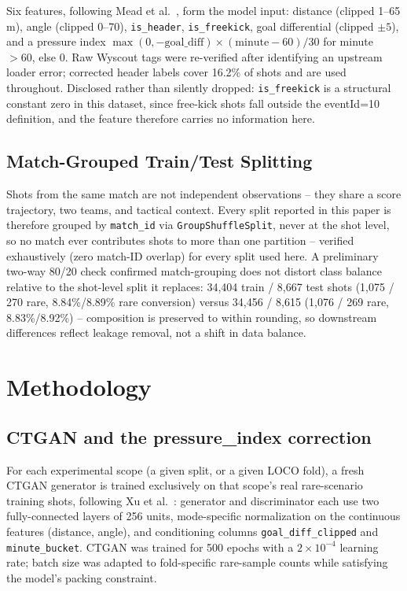 \documentclass[conference,a4paper]{IEEEtran}
\begin{document}
Six features, following Mead et al.~\cite{mead2023expected}, form the model input: distance (clipped 1--65\,m), angle (clipped 0--70\textdegree), \texttt{is\_header}, \texttt{is\_freekick}, goal differential (clipped $\pm5$), and a pressure index $\max(0,-\text{goal\_diff})\times(\text{minute}-60)/30$ for minute $>60$, else 0. Raw Wyscout tags were re-verified after identifying an upstream loader error; corrected header labels cover 16.2\% of shots and are used throughout. Disclosed rather than silently dropped: \texttt{is\_freekick} is a structural constant zero in this dataset, since free-kick shots fall outside the eventId=10 definition, and the feature therefore carries no information here.

\subsection{Match-Grouped Train/Test Splitting}
\label{sec:matchgroup}
Shots from the same match are not independent observations -- they share a score trajectory, two teams, and tactical context. Every split reported in this paper is therefore grouped by \texttt{match\_id} via \texttt{GroupShuffleSplit}, never at the shot level, so no match ever contributes shots to more than one partition -- verified exhaustively (zero match-ID overlap) for every split used here. A preliminary two-way 80/20 check confirmed match-grouping does not distort class balance relative to the shot-level split it replaces: 34,404 train / 8,667 test shots (1,075 / 270 rare, 8.84\%/8.89\% rare conversion) versus 34,456 / 8,615 (1,076 / 269 rare, 8.83\%/8.92\%) -- composition is preserved to within rounding, so downstream differences reflect leakage removal, not a shift in data balance.

\section{Methodology}
\label{sec:methods}

\subsection{CTGAN and the pressure\_index correction}
For each experimental scope (a given split, or a given LOCO fold), a fresh CTGAN generator is trained exclusively on that scope's real rare-scenario training shots, following Xu et al.~\cite{xu2019modeling}: generator and discriminator each use two fully-connected layers of 256 units, mode-specific normalization on the continuous features (distance, angle), and conditioning columns \texttt{goal\_diff\_clipped} and \texttt{minute\_bucket}. CTGAN was trained for 500 epochs with a $2\times10^{-4}$ learning rate; batch size was adapted to fold-specific rare-sample counts while satisfying the model's packing constraint.
\end{document}
